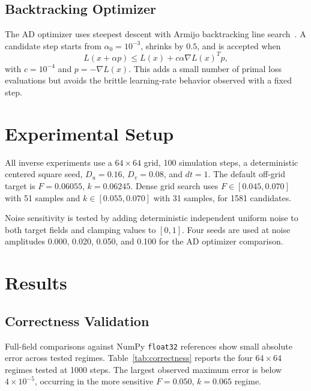 \documentclass[journal]{IEEEtran}
\begin{document}
\subsection{Backtracking Optimizer}
The AD optimizer uses steepest descent with Armijo backtracking line
search~\cite{armijo1966minimization,nocedal2006numerical}. A candidate step
starts from \(\alpha_0 = 10^{-3}\), shrinks by \(0.5\), and is
accepted when
\begin{equation}
  L(x+\alpha p) \le L(x) + c\alpha \nabla L(x)^T p,
\end{equation}
with \(c=10^{-4}\) and \(p=-\nabla L(x)\). This adds a small number of primal
loss evaluations but avoids the brittle learning-rate behavior observed with a
fixed step.

\section{Experimental Setup}
All inverse experiments use a \(64\times64\) grid, 100 simulation steps, a
deterministic centered square seed, \(D_u=0.16\), \(D_v=0.08\), and \(dt=1\).
The default off-grid target is \(F=0.06055\), \(k=0.06245\). Dense grid search
uses \(F\in[0.045,0.070]\) with 51 samples and \(k\in[0.055,0.070]\) with 31
samples, for 1581 candidates.

Noise sensitivity is tested by adding deterministic independent uniform noise
to both target fields and clamping values to \([0,1]\). Four seeds are used at
noise amplitudes 0.000, 0.020, 0.050, and 0.100 for the AD optimizer comparison.

\section{Results}
\subsection{Correctness Validation}
Full-field comparisons against NumPy \texttt{float32} references show small
absolute error across tested regimes. Table~\ref{tab:correctness} reports the
four \(64\times64\) regimes tested at 1000 steps. The largest observed maximum
error is below \(4\times10^{-5}\), occurring in the more sensitive
\(F=0.050\), \(k=0.065\) regime.
\end{document}
